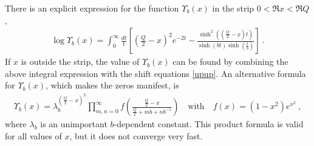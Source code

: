 \documentclass[12pt, a4paper, notitlepage, twoside]{report}
\numberwithin{equation}{section}
\theoremstyle{break}
\begin{document}
There is an explicit expression for the function $\Upsilon_b(x)$ in the strip $0<\Re x<\Re Q$, 
\begin{align}
 \log\Upsilon_b(x) = \int_0^\infty \frac{dt}{t} \left[\left(\tfrac{Q}{2}-x\right)^2 e^{-2t} -\frac{\sinh^2\left(\left(\frac{Q}{2}-x\right)\!t\right)}{\sinh (bt)\sinh\left(\frac{t}{b}\right)}\right]\ .
\label{lup}
\end{align}
If $x$ is outside the strip, the value of $\Upsilon_b(x)$ can be found by combining the above integral expression with the shift equations \eqref{upup}.
An alternative formula for $\Upsilon_b(x)$, which makes the zeros manifest, is 
\begin{align}
 \Upsilon_b(x) = \lambda_b^{(\frac{Q}{2}-x)^2}\prod_{m,n=0}^\infty f\left(\frac{\frac{Q}{2}-x}{\frac{Q}{2}+mb+nb^{-1}}\right) \quad \text{with} \quad f(x)=(1-x^2)e^{x^2}\ ,
\end{align}
where $\lambda_b$ is an unimportant $b$-dependent constant.
This product formula is valid for all values of $x$, but it does not converge very fast.
\end{document}
